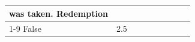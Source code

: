 \begin{table}[H]
\begin{tabular}{lllrlllll}
was taken. Redemption \\
\cline{1-9}
False & 2.5%

\end{tabular}
\end{table}
